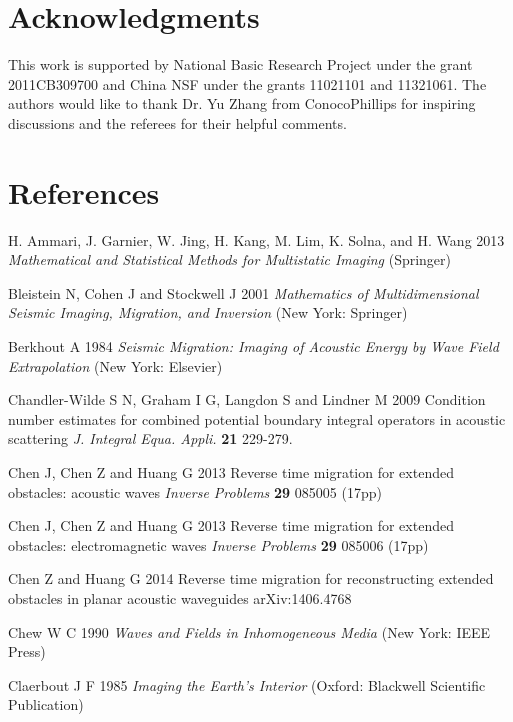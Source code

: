 \documentclass[11pt]{iopart}
\begin{document}
\section*{Acknowledgments} This work is  supported by National Basic Research Project under the grant 2011CB309700 and China NSF under the grants 11021101 and 11321061. The authors would like to thank Dr. Yu Zhang from ConocoPhillips for inspiring discussions and the referees for their helpful comments.

\section*{References}


\begin{thebibliography}{99}

H. Ammari, J. Garnier, W. Jing, H. Kang, M. Lim, K. Solna, and H. Wang 2013 {\em Mathematical and Statistical Methods for Multistatic Imaging} (Springer)

Bleistein N, Cohen J and Stockwell J 2001 {\em Mathematics of Multidimensional Seismic Imaging, Migration, and Inversion} (New York: Springer)

{Berkhout A}  1984 {\em Seismic Migration: Imaging of Acoustic Energy by Wave Field Extrapolation}  (New York: Elsevier)

Chandler-Wilde S N,   Graham I G,   Langdon S  and Lindner M 2009  Condition number estimates for combined
potential boundary integral operators in acoustic scattering {\it J. Integral Equa. Appli.} {\bf 21}  229-279.

  Chen J,  Chen Z and  Huang G 2013 {Reverse time migration for extended obstacles: acoustic waves}  {\it Inverse Problems} {\bf 29}  085005 (17pp)

Chen J,  Chen Z and  Huang G 2013 {Reverse time migration for extended obstacles: electromagnetic waves} {\it Inverse Problems}
{\bf 29} 085006 (17pp)

Chen Z  and  Huang G 2014 {Reverse time migration for reconstructing extended obstacles in planar acoustic waveguides} arXiv:1406.4768

Chew W C 1990 {\em Waves and Fields in Inhomogeneous Media} (New York: IEEE Press)

{ Claerbout J F } 1985  { \em Imaging the Earth's Interior} (Oxford: Blackwell Scientific Publication)


\end{thebibliography}
\end{document}
